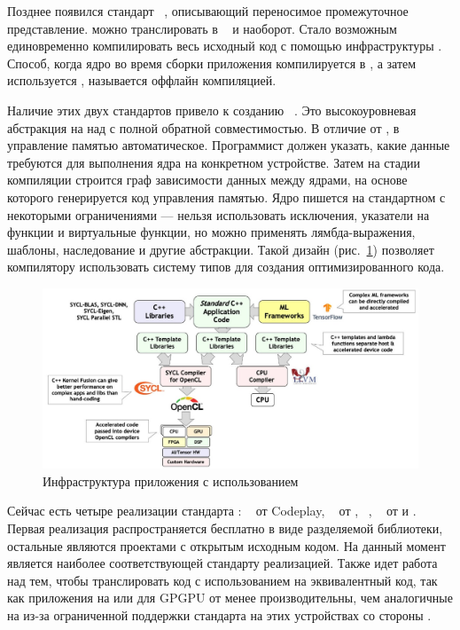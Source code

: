 Позднее появился стандарт ~\cite{SPIR-V}, описывающий
переносимое промежуточное представление.
 можно транслировать в ~\cite{LLVM} и наоборот.
Стало возможным единовременно компилировать весь исходный код с помощью 
инфраструктуры .
Способ, когда ядро во время сборки приложения компилируется в
, а затем используется , 
называется оффлайн компиляцией.

Наличие этих двух стандартов привело к созданию ~\cite{SYCL}.
Это высокоуровневая абстракция на  над  с полной
обратной совместимостью.
В отличие от , в  управление памятью автоматическое.
Программист должен указать, какие данные требуются для выполнения ядра на
конкретном устройстве.
Затем на стадии компиляции строится граф зависимости данных между 
ядрами, на основе которого генерируется код управления памятью.
Ядро пишется на стандартном  с некоторыми ограничениями --- 
нельзя использовать исключения, указатели на функции и виртуальные функции, 
но можно применять лямбда-выражения, шаблоны, наследование и другие абстракции.
Такой дизайн (рис.~\ref{SYCL_infrastructure}) позволяет компилятору 
использовать систему типов  для создания оптимизированного кода.
\begin{figure}
  \centering
  \includegraphics[width=\columnwidth]{sycl.jpg}
  \caption{Инфраструктура приложения с использованием ~\cite{SYCL}}
  \label{SYCL_infrastructure}
\end{figure}

Сейчас есть четыре реализации стандарта : 
~\cite{ComputeCpp} от Codeplay,
~\cite{DPC} от ,
~\cite{hipSYCL},
~\cite{triSYCL} от  и .
Первая реализация распространяется бесплатно в виде разделяемой библиотеки,
остальные являются проектами с открытым исходным кодом.
На данный момент  является наиболее соответствующей 
стандарту реализацией.
Также идет работа над тем, чтобы транслировать код с использованием  
на эквивалентный  код, так как приложения на  или
 для GPGPU от  менее производительны, чем аналогичные 
на  из-за ограниченной поддержки стандарта  на этих 
устройствах со стороны .


